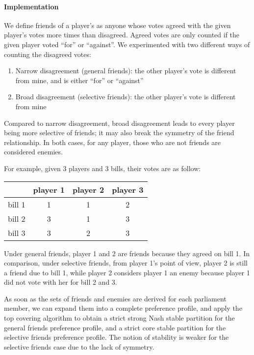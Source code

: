 \paragraph{Implementation}

We define friends of a player's as anyone whose votes agreed with the given
player's votes more times than disagreed.
Agreed votes are only counted if the given player voted ``for'' or ``against''.
We experimented with two different ways of counting the disagreed votes:

\begin{enumerate}
  \item Narrow disagreement (general friends): the other player's vote is different from mine, and is either ``for'' or ``against''
  \item Broad disagreement (selective friends): the other player's vote is different from mine
\end{enumerate}

Compared to narrow disagreement, broad disagreement leads to every player being
more selective of friends; it may also break the symmetry of the friend relationship.
In both cases, for any player, those who are not friends are considered enemies.

\begin{example}
\label{example:votes_friends}
  For example, given 3 players and 3 bills, their votes are as follow:

  \begin{table}[h!]
  \centering
  \begin{tabular}{|c|c|c|c|}
  \hline
         & player 1 & player 2 & player 3 \\ \hline
  bill 1 & 1 & 1 & 2 \\
  bill 2 & 3 & 1 & 3 \\
  bill 3 & 3 & 2 & 3 \\
  \hline
  \end{tabular}
  \end{table}

\end{example}

Under general friends, player 1 and 2 are friends because they agreed on bill 1.
In comparison, under selective friends, from player 1's point of view, player 2
is still a friend due to bill 1, while player 2 considers player 1 an enemy
because player 1 did not vote with her for bill 2 and 3.

As soon as the sets of friends and enemies are derived for each parliament member,
we can expand them into a complete preference profile, and apply the top covering
algorithm to obtain a strict strong Nash stable partition for the general friends
preference profile, and a strict core stable partition for the selective friends
preference profile. The notion of stability is weaker for the selective friends case
due to the lack of symmetry.

